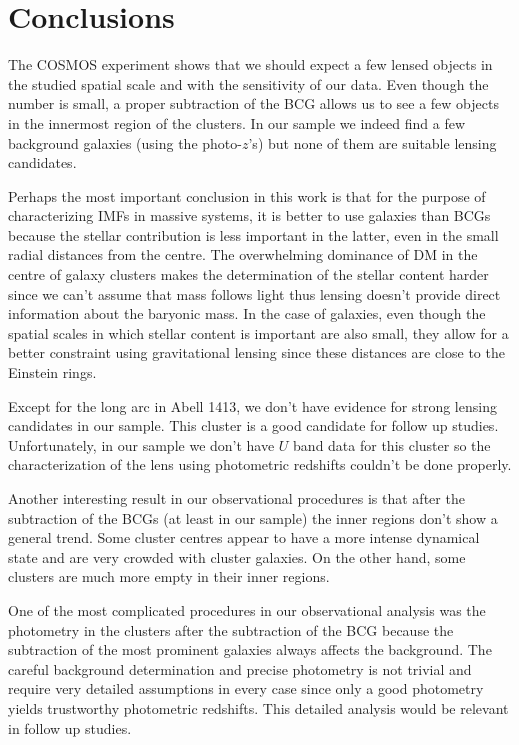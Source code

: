 \chapter{Conclusions}

The COSMOS experiment shows that we should expect a few lensed objects in the studied spatial scale and with the sensitivity of our data. Even though the number is small, a proper subtraction of the BCG allows us to see a few objects in the innermost region of the clusters. In our sample we indeed find a few background galaxies (using the photo-$z$'s) but none of them are suitable lensing candidates.

Perhaps the most important conclusion in this work is that for the purpose of characterizing IMFs in massive systems, it is better to use galaxies than BCGs because the stellar contribution is less important in the latter, even in the small radial distances from the centre. The overwhelming dominance of DM in the centre of galaxy clusters makes the determination of the stellar content harder since we can't assume that mass follows light thus lensing doesn't provide direct information about the baryonic mass. In the case of galaxies, even though the spatial scales in which stellar content is important are also small, they allow for a better constraint using gravitational lensing since these distances are close to the Einstein rings.

Except for the long arc in Abell 1413, we don't have evidence for strong lensing candidates in our sample. This cluster is a good candidate for follow up studies. Unfortunately, in our sample we don't have $U$ band data for this cluster so the characterization of the lens using photometric redshifts couldn't be done properly. 

Another interesting result in our observational procedures is that after the subtraction of the BCGs (at least in our sample) the inner regions don't show a general trend. Some cluster centres appear to have a more intense dynamical state and are very crowded with cluster galaxies. On the other hand, some clusters are much more empty in their inner regions.

One of the most complicated procedures in our observational analysis was the photometry in the clusters after the subtraction of the BCG because the subtraction of the most prominent galaxies always affects the background. The careful background determination and precise photometry is not trivial and require very detailed assumptions in every case since only a good photometry yields trustworthy photometric redshifts. This detailed analysis would be relevant in follow up studies.

